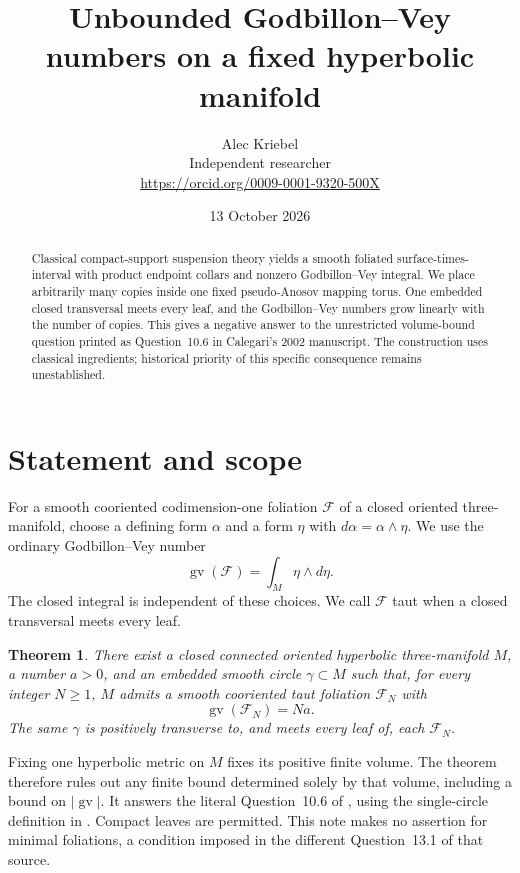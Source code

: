 \documentclass[11pt]{article}
\title{Unbounded Godbillon--Vey numbers on a fixed hyperbolic manifold}
\author{Alec Kriebel\\[2pt]
\small Independent researcher\\
\small\url{https://orcid.org/0009-0001-9320-500X}}
\date{13 October 2026}
\newtheorem{theorem}{Theorem}
\newcommand{\GV}{\operatorname{gv}}
\begin{document}
\maketitle
\begin{abstract}
Classical compact-support suspension theory yields a smooth foliated
surface-times-interval with product endpoint collars and nonzero
Godbillon--Vey integral. We place arbitrarily many copies inside one fixed
pseudo-Anosov mapping torus. One embedded closed transversal meets every
leaf, and the Godbillon--Vey numbers grow linearly with the number of
copies. This gives a negative answer to the unrestricted volume-bound
question printed as Question~10.6 in Calegari's 2002 manuscript.
The construction uses classical ingredients; historical priority of this
specific consequence remains unestablished.
\end{abstract}

\section{Statement and scope}
For a smooth cooriented codimension-one foliation $\mathcal F$ of a closed
oriented three-manifold, choose a defining form $\alpha$ and a form $\eta$
with $d\alpha=\alpha\wedge\eta$. We use the ordinary Godbillon--Vey number
\[
       \GV(\mathcal F)=\int_M\eta\wedge d\eta .
\]
The closed integral is independent of these choices. We call $\mathcal F$
taut when a closed transversal meets every leaf.

\begin{theorem}\label{thm:main}
There exist a closed connected oriented hyperbolic three-manifold $M$,
a number $a>0$, and an embedded smooth circle $\gamma\subset M$ such that,
for every integer $N\geq1$, $M$ admits a smooth cooriented taut foliation
$\mathcal F_N$ with
\[
             \GV(\mathcal F_N)=Na .
\]
The same $\gamma$ is positively transverse to, and meets every leaf of,
each $\mathcal F_N$.
\end{theorem}

Fixing one hyperbolic metric on $M$ fixes its positive finite volume.
The theorem therefore rules out any finite bound determined solely by
that volume, including a bound on $|\GV|$. It answers the literal
Question~10.6 of \cite[p.~25]{C02}, using the single-circle definition
in \cite[Definition~1.1]{C02}. Compact leaves are permitted.
This note makes no assertion for minimal foliations, a condition imposed
in the different Question~13.1 of that source.
\end{document}
